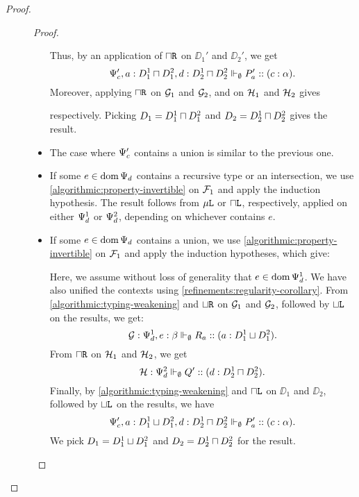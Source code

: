 \begin{proof}
\begin{description}
\begin{proof}
\begin{itemize}
\begin{mathpar}
      \end{mathpar}
      Thus, by an application of $\intersect\Right$ on $\DD_1'$ and $\DD_2'$, we get
      $$\typeRecA {\ctx_c', a : D_1^1 \intersect D_1^2, d : D_2^1 \intersect D_2^2} \emptyset {P_a'} c \typeList.$$
      Moreover, applying $\intersect\Right$ on $\GG_1$ and $\GG_2$, and on $\HH_1$ and $\HH_2$ gives
      respectively. Picking $D_1 = D_1^1 \intersect D_1^2$ and $D_2 = D_2^1 \intersect D_2^2$ gives the result.
      \item The case where $\ctx_c'$ contains a union is similar to the previous one.


      \item If some $e \in \dom{\ctx_d}$ contains a recursive type or an intersection, we use \cref{algorithmic:property-invertible} on $\FF_1$ and apply the induction hypothesis. The result follows from $\mu\Left$ or $\intersect\Left$, respectively, applied on either $\ctx_d^1$ or $\ctx_d^2$, depending on whichever contains $e$.
      \item If some $e \in \dom{\ctx_d}$ contains a union, we use \cref{algorithmic:property-invertible} on $\FF_1$ and apply the induction hypotheses, which give:
      Here, we assume without loss of generality that $e \in \dom{\ctx_d^1}$. We have also unified the contexts using \cref{refinements:regularity-corollary}. From \cref{algorithmic:typing-weakening} and $\union\Right$ on $\GG_1$ and $\GG_2$, followed by $\union\Left$ on the results, we get:
      $$
        \GG : \typeRecA {\ctx_d^1, e : \typeListB} \emptyset {R_a} a {D_1^1 \union D_1^2}.
      $$
      From $\intersect\Right$ on $\HH_1$ and $\HH_2$, we get
      $$
        \HH : \typeRecA {\ctx_d^2} \emptyset {Q'} d {D_2^1 \intersect D_2^2}.
      $$
      Finally, by \cref{algorithmic:typing-weakening} and $\intersect\Left$ on $\DD_1$ and $\DD_2$, followed by $\union\Left$ on the results, we have
      $$
        \typeRecA {\ctx_c', a : D_1^1 \union D_1^2, d : D_2^1 \intersect D_2^2} \emptyset {P_a'} c \typeList.
      $$
      We pick $D_1 = D_1^1 \union D_1^2$ and $D_2 = D_2^1 \intersect D_2^2$ for the result.


\end{itemize}
\end{proof}
\end{description}
\end{proof}
